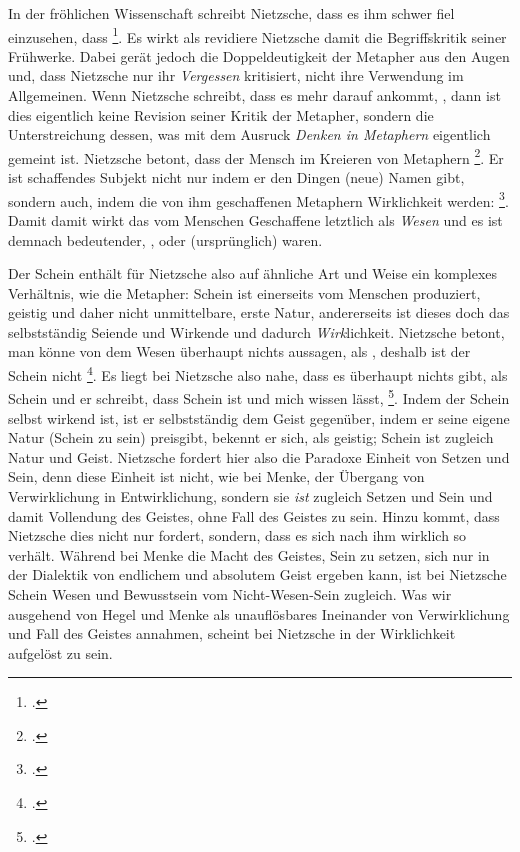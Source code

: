 \documentclass[12pt, a4paper, openany]{report}
\begin{document}
In der fröhlichen Wissenschaft schreibt Nietzsche, dass es ihm schwer fiel einzusehen, dass \footcite[][422]{nietzsche_morgenrote_1999}.
Es wirkt als revidiere Nietzsche damit die Begriffskritik seiner Frühwerke.
Dabei gerät jedoch die Doppeldeutigkeit der Metapher aus den Augen und, dass Nietzsche nur ihr \emph{Vergessen} kritisiert, nicht ihre Verwendung im Allgemeinen. 
Wenn Nietzsche schreibt, dass es mehr darauf ankommt, , dann ist dies eigentlich keine Revision seiner Kritik der Metapher, sondern die Unterstreichung dessen, was mit dem Ausruck \emph{Denken in Metaphern} eigentlich gemeint ist.
Nietzsche betont, dass der Mensch im Kreieren von Metaphern \footcite[][883]{nietzsche_geburt_1999}.
Er ist schaffendes Subjekt nicht nur indem er den Dingen (neue) Namen gibt, sondern auch, indem die von ihm geschaffenen Metaphern Wirklichkeit werden: 
\footcite[][422]{nietzsche_morgenrote_1999}.
Damit damit wirkt das vom Menschen Geschaffene letztlich als \emph{Wesen} und es ist demnach bedeutender, , oder (ursprünglich) waren.

Der Schein enthält für Nietzsche also auf ähnliche Art und Weise ein komplexes Verhältnis, wie die Metapher: 
Schein ist einerseits vom Menschen produziert, geistig und daher nicht unmittelbare, erste Natur, andererseits ist dieses doch das selbstständig Seiende und Wirkende und dadurch \emph{Wirk}lichkeit.
Nietzsche betont, man könne von dem Wesen überhaupt nichts aussagen, als , deshalb ist der Schein nicht \footcite[][417]{nietzsche_geburt_1999}.
Es liegt bei Nietzsche also nahe, dass es überhaupt nichts gibt, als Schein und er schreibt, dass Schein  ist und mich wissen lässt, \footcite[][417]{nietzsche_morgenrote_1999}.
Indem der Schein selbst wirkend ist, ist er selbstständig dem Geist gegenüber, indem er seine eigene Natur (Schein zu sein) preisgibt, bekennt er sich, als geistig;
Schein ist zugleich Natur und Geist.
Nietzsche fordert hier also die Paradoxe Einheit von Setzen und Sein, denn diese Einheit ist nicht, wie bei Menke, der Übergang von Verwirklichung in Entwirklichung, sondern sie \emph{ist} zugleich Setzen und Sein und damit Vollendung des Geistes, ohne Fall des Geistes zu sein.
Hinzu kommt, dass Nietzsche dies nicht nur fordert, sondern, dass es sich nach ihm wirklich so verhält.
Während bei Menke die Macht des Geistes, Sein zu setzen, sich nur in der Dialektik von endlichem und absolutem Geist ergeben kann,
ist bei Nietzsche Schein Wesen und Bewusstsein vom Nicht-Wesen-Sein zugleich.
Was wir ausgehend von Hegel und Menke als unauflösbares Ineinander von Verwirklichung und Fall des Geistes annahmen, scheint bei Nietzsche in der Wirklichkeit aufgelöst zu sein. \\
\end{document}
